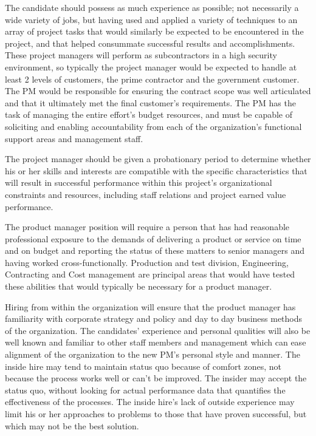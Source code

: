 \documentclass[letterpaper,10pt]{article}
\begin{document}
The candidate should possess as much experience as possible; not necessarily a wide variety of jobs, but having used and applied a variety of techniques to an array of project tasks that would similarly be expected to be encountered in the project, and that helped consummate successful results and accomplishments.  These project managers will perform as subcontractors in a high security environment, so typically the project manager would be expected to handle at least 2 levels of customers, the prime contractor and the government customer.  The PM would be responsible for ensuring the contract scope was well articulated and that it ultimately met the final customer's requirements.  The PM has the task of managing the entire effort's budget resources, and must be capable of soliciting and enabling accountability from each of the organization's functional support areas and management staff.

The project manager should be given a probationary period to determine whether his or her skills and interests are compatible with the specific characteristics that will result in successful performance within this project's organizational constraints and resources, including staff relations and project earned value performance.  

The product manager position will require a person that has had reasonable professional exposure to the demands of delivering a product or service on time and on budget and reporting the status of these matters to senior managers and having worked cross-functionally.  Production and test division, Engineering, Contracting and Cost management are principal areas that would have tested these abilities that would typically be necessary for a product manager.  

Hiring from within the organization will ensure that the product manager has familiarity with corporate strategy and policy and day to day business methods of the organization.  The candidates’ experience and personal qualities will also be well known and familiar to other staff members and management which can ease alignment of the organization to the new PM's personal style and manner.  The inside hire may tend to maintain status quo because of comfort zones, not because the process works well or can't be improved.  The insider may accept the status quo, without looking for actual performance data that quantifies the effectiveness of the processes.  The inside hire's lack of outside experience may limit his or her approaches to problems to those that have proven successful, but which may not be the best solution.
\end{document}
